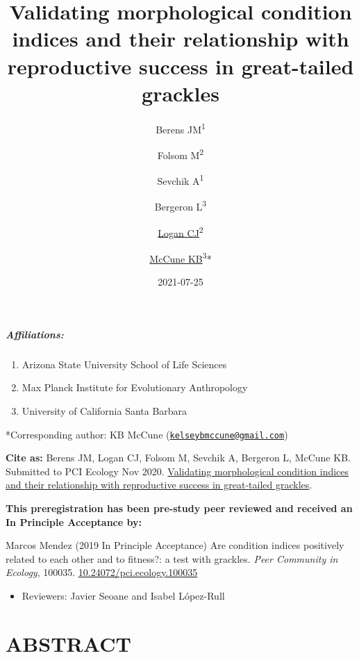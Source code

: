 \documentclass[
]{article}
\title{Validating morphological condition indices and their relationship
with reproductive success in great-tailed grackles}
\author{Berens JM\textsuperscript{1} \and Folsom
M\textsuperscript{2} \and Sevchik A\textsuperscript{1} \and Bergeron
L\textsuperscript{3} \and \href{http://CorinaLogan.com}{Logan
CJ}\textsuperscript{2} \and \href{https://www.kelseymccune.com/}{McCune
KB}\textsuperscript{3}*}
\date{2021-07-25}
\providecommand{\tightlist}{%
  \setlength{\itemsep}{0pt}\setlength{\parskip}{0pt}}
\begin{document}
\maketitle

\hypertarget{affiliations}{%
\subparagraph{Affiliations:}\label{affiliations}}

\begin{enumerate}
\def\labelenumi{\arabic{enumi})}
\tightlist
\item
  Arizona State University School of Life Sciences
\item
  Max Planck Institute for Evolutionary Anthropology
\item
  University of California Santa Barbara
\end{enumerate}

*Corresponding author: KB McCune
(\href{mailto:kelseybmccune@gmail.com}{\nolinkurl{kelseybmccune@gmail.com}})

\textbf{Cite as:} Berens JM, Logan CJ, Folsom M, Sevchik A, Bergeron L,
McCune KB. Submitted to PCI Ecology Nov 2020.
\href{http://corinalogan.com/Preregistrations/gcondition.html}{Validating
morphological condition indices and their relationship with reproductive
success in great-tailed grackles}.

\textbf{This preregistration has been pre-study peer reviewed and
received an In Principle Acceptance by:}

Marcos Mendez (2019 In Principle Acceptance) Are condition indices
positively related to each other and to fitness?: a test with grackles.
\emph{Peer Community in Ecology}, 100035.
\href{https://doi.org/10.24072/pci.ecology.100035}{10.24072/pci.ecology.100035}

\begin{itemize}
\tightlist
\item
  Reviewers: Javier Seoane and Isabel López-Rull
\end{itemize}

\hypertarget{abstract}{%
\section{ABSTRACT}\label{abstract}}
\end{document}
